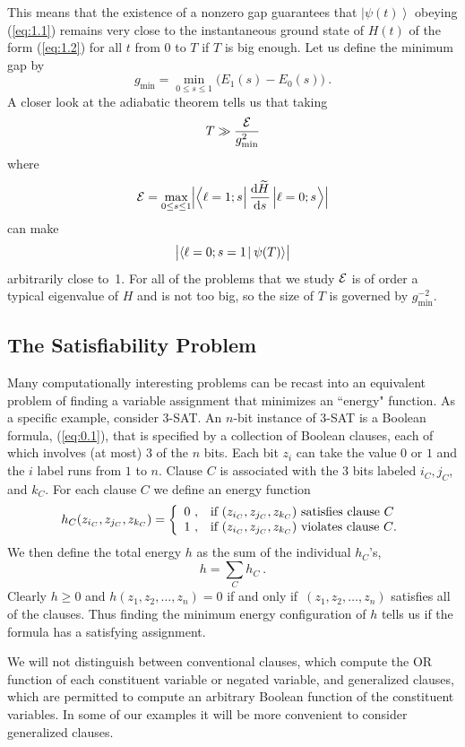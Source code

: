\documentclass[twoside]{article}
\makeatletter
\newcommand{\ket}[1]{\left|#1\right\rangle}
\newcommand{\bra}[1]{\left\langle#1\right|}
\newcommand{\braket}[2]{\left\langle{#1}\mkern-2mu
\mid \mkern-2mu{#2}
\right\rangle}
\newcommand{\braketnew}[2]{\left\langle{#1}\vphantom{#2}
\mkern2mu
 \right| \mkern1mu \left.\mkern-2mu{#2}\vphantom{#1}
\right\rangle}
\let\braket\braketnew
\newcommand{\numEq}[2]{\begin{equation}
   \label{eq:#1}
   #2\end{equation}}
\newcommand{\refEq}[1]{(\ref{eq:#1})}
\newcommand{\rd}{\mathrm{d}}
\newcommand{\gm}{g_{\min}}
\newcommand{\ifff}{if and only if}
\let\tilde\widetilde
\newcommand{\Cases}[1]{\left\{ 
  \begin{array}{r@{\ ,}@{\quad}l}
  #1
  \end{array}\right.}
\numberwithin{equation}{section}
\makeatother
\begin{document}
This means that the existence of a nonzero gap guarantees that
$\ket{\psi(t)}$ obeying
\refEq{1.1} remains very close to the instantaneous ground state of $H(t)$
of the form \refEq{1.2} for all
$t$ from $0$ to $T$ if $T$ is big enough.  Let us define the minimum gap by
\numEq{1.7}{
\gm =\min_{0\leq s\leq 1} \bigl(E_1(s)-E_0(s)\bigr)\ . }  A closer look at
the adiabatic theorem tells us that taking
\numEq{1.8}{ T \gg \frac{{\cal E}}{\gm^2} } where 
\numEq{1.9new}{ {\cal E} = \max_{0\le s \le 1} \Bigl| \bra{\ell =1;
s^{\mathstrut}}
\frac{\rd\tilde H }{\rd s} 
\ket{\ell=0;s^{\mathstrut}}\Bigr| } 
 can make 
\numEq{2.10}{  \bigl| \braket{\ell =0;
s=1}{\psi(T)}
\bigr| } arbitrarily close to~1.  For all of the problems that we study 
${\cal E}$ is of order a typical eigenvalue of $H$ and is not too big, so the
size of $T$ is governed by $\gm^{-2}$.

\subsection{The Satisfiability Problem} Many computationally interesting
problems can be recast into an equivalent problem of finding a variable
assignment that minimizes an ``energy" function.  As a specific example,
consider 3-SAT\null.  An $n$-bit instance of 3-SAT is a Boolean formula,
\refEq{0.1}, that is specified by a collection of Boolean clauses, each of
which involves (at most) 3 of the
$n$ bits.   Each bit $z_i$ can take the value
$0$ or
$1$ and the $i$ label runs from
$1$ to $n$.  Clause $C$ is associated with the 3 bits  labeled $i_C, j_C$, and
$k_C$.  For each clause $C$ we define an energy function
\numEq{1.9}{ h_C(z_{i_C}, z_{j_C}, z_{k_C}) = \Cases{0& \mbox{if
$(z_{i_C}, z_{j_C}, z_{k_C})$  satisfies   clause   $C$}\\ 1 & \mbox{if
$(z_{i_C}, z_{j_C}, z_{k_C})$  violates  clause $C$.}} } We then define the total
energy  $h$ as the sum of the individual
$h_C$'s,
\numEq{1.10}{ h= \sum_C h_C\ . }
 Clearly $h\geq 0$ and $h (z_1, z_2,\dots, z_n)=0$ \ifff\  $(z_1, z_2,\dots,
z_n)$ satisfies all of the clauses. Thus  finding the minimum energy
configuration of
$h$ tells us if the formula has a satisfying assignment.

We will not distinguish between conventional clauses, which compute the
OR function of each constituent variable or negated variable, and
generalized clauses, which are permitted to compute an arbitrary Boolean
function of the constituent variables.  In some of our examples it will be
more convenient to consider generalized clauses.
\end{document}
